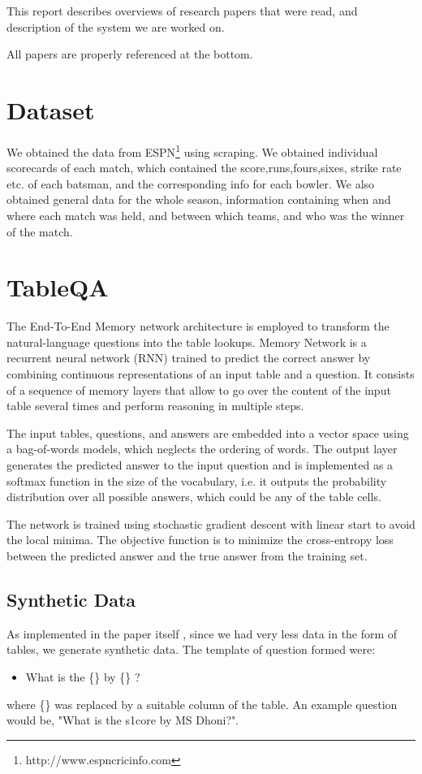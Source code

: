 \documentclass[a4paper]{article}
\begin{document}
This report describes overviews of research papers that were read, and description of the system we are worked on.

All papers are properly referenced at the bottom.

\section{Dataset}\label{sec:dataset}
We obtained the data from ESPN\footnote{http://www.espncricinfo.com} using scraping. We obtained individual scorecards of each match, which contained the score,runs,fours,sixes, strike rate etc. of each batsman, and the corresponding info for each bowler. We also obtained general data for the whole season, information containing when and where each match was held, and between which teams, and who was the winner of the match.

\section{TableQA}\label{sec:tableQA}
The End-To-End Memory network architecture \cite{NIPS2015_5846} is employed to transform the natural-language questions into the table lookups. Memory Network \cite{DBLP:journals/corr/WestonCB14} is a recurrent neural network (RNN) trained to predict the correct answer by combining continuous representations of an input table and a question. It consists of a sequence of memory layers that allow to go over the content of the input table several times and perform reasoning in multiple steps.

The input tables, questions, and answers are embedded into a vector space using a bag-of-words models, which neglects the ordering of words.
The output layer generates the predicted answer to the input question and is implemented as a softmax function in the size of the vocabulary, i.e. it outputs the probability distribution over all possible answers, which could be any of the table cells.

The network is trained using stochastic gradient descent with linear start to avoid the local minima. The objective function is to minimize the cross-entropy loss between the predicted answer and the true answer from the training set.

\subsection{Synthetic Data}\label{subsec:synthdata}
As implemented in the paper itself \cite{DBLP:journals/corr/VakulenkoS17}, since we had very less data in the form of tables, we generate synthetic data.
The template of question formed were:
\begin{itemize}
	\item What is the \{\} by \{\} ?
\end{itemize}
where \{\} was replaced by a suitable column of the table. An example question would be, "What is the s1core by MS Dhoni?".
\end{document}
